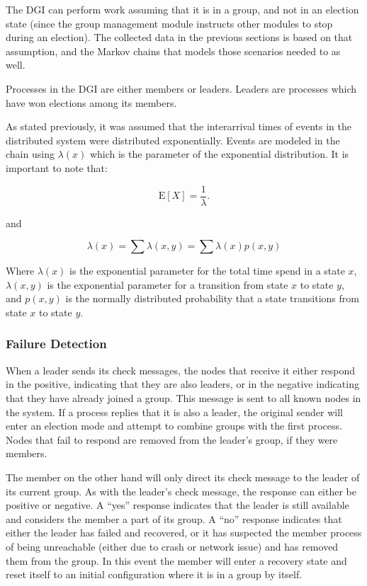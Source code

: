 The DGI can perform work assuming that it is in a group, and not in an election
state (since the group management module instructs other modules to stop during
an election). The collected data in the previous sections is based on that
assumption, and the Markov chains that models those scenarios needed to as
well.

Processes in the DGI are either members or leaders. Leaders are processes
which have won elections among its members.

As stated previously, it was assumed that the interarrival times of events in the distributed system
were distributed exponentially. Events are modeled in the chain
using $\lambda(x)$ which is the parameter of the exponential distribution. It
is important to note that:

\begin{equation}
\mathrm{E}[X] = \frac{1}{\lambda}. \!
\end{equation}

and

\begin{equation}
\lambda(x) = \sum \lambda(x,y) = \sum \lambda(x) p(x,y)
\end{equation}

Where $\lambda(x)$ is the exponential parameter for the total time spend in
a state $x$, $\lambda(x,y)$ is the exponential parameter for a transition from
state $x$ to state $y$, and $p(x,y)$ is the normally distributed probability that
a state transitions from state $x$ to state $y$.

\subsubsection{Failure Detection}
When a leader sends its check messages, the nodes that receive it either
respond in the positive, indicating that they are also leaders, or in the
negative indicating that they have already joined a group. This message is sent
to all known nodes in the system. If a process replies that it is also a
leader, the original sender will enter an election mode and attempt to combine
groups with the first process. Nodes that fail to respond are removed from the
leader's group, if they were members.

The member on the other hand will only direct its check message to the leader
of its current group. As with the leader's check message, the response can
either be positive or negative. A ``yes'' response indicates that the leader is
still available and considers the member a part of its group. A ``no'' response
indicates that either the leader has failed and recovered, or it has suspected
the member process of being unreachable (either due to crash or network issue)
and has removed them from the group. In this event the member will enter a
recovery state and reset itself to an initial configuration where it is in a
group by itself.

